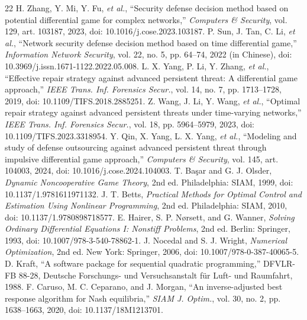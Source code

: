 \documentclass[conference,letterpaper]{IEEEtran}
\begin{document}
\begin{thebibliography}{22}
 H. Zhang, Y. Mi, Y. Fu, \emph{et al.}, ``Security defense decision method based on potential differential game for complex networks,'' \emph{Computers \& Security}, vol. 129, art. 103187, 2023, doi: 10.1016/j.cose.2023.103187.
 P. Sun, J. Tan, C. Li, \emph{et al.}, ``Network security defense decision method based on time differential game,'' \emph{Information Network Security}, vol. 22, no. 5, pp. 64--74, 2022 (in Chinese), doi: 10.3969/j.issn.1671-1122.2022.05.008.
 L. X. Yang, P. Li, Y. Zhang, \emph{et al.}, ``Effective repair strategy against advanced persistent threat: A differential game approach,'' \emph{IEEE Trans. Inf. Forensics Secur.}, vol. 14, no. 7, pp. 1713--1728, 2019, doi: 10.1109/TIFS.2018.2885251.
 Z. Wang, J. Li, Y. Wang, \emph{et al.}, ``Optimal repair strategy against advanced persistent threats under time-varying networks,'' \emph{IEEE Trans. Inf. Forensics Secur.}, vol. 18, pp. 5964--5979, 2023, doi: 10.1109/TIFS.2023.3318954.
 Y. Qin, X. Yang, L. X. Yang, \emph{et al.}, ``Modeling and study of defense outsourcing against advanced persistent threat through impulsive differential game approach,'' \emph{Computers \& Security}, vol. 145, art. 104003, 2024, doi: 10.1016/j.cose.2024.104003.
 T. Ba\c{s}ar and G. J. Olsder, \emph{Dynamic Noncooperative Game Theory}, 2nd ed. Philadelphia: SIAM, 1999, doi: 10.1137/1.9781611971132.
 J. T. Betts, \emph{Practical Methods for Optimal Control and Estimation Using Nonlinear Programming}, 2nd ed. Philadelphia: SIAM, 2010, doi: 10.1137/1.9780898718577.
 E. Hairer, S. P. N\o rsett, and G. Wanner, \emph{Solving Ordinary Differential Equations I: Nonstiff Problems}, 2nd ed. Berlin: Springer, 1993, doi: 10.1007/978-3-540-78862-1.
 J. Nocedal and S. J. Wright, \emph{Numerical Optimization}, 2nd ed. New York: Springer, 2006, doi: 10.1007/978-0-387-40065-5.
 D. Kraft, ``A software package for sequential quadratic programming,'' DFVLR-FB 88-28, Deutsche Forschungs- und Versuchsanstalt f\"ur Luft- und Raumfahrt, 1988.
 F. Caruso, M. C. Ceparano, and J. Morgan, ``An inverse-adjusted best response algorithm for Nash equilibria,'' \emph{SIAM J. Optim.}, vol. 30, no. 2, pp. 1638--1663, 2020, doi: 10.1137/18M1213701.
\end{thebibliography}
\end{document}
